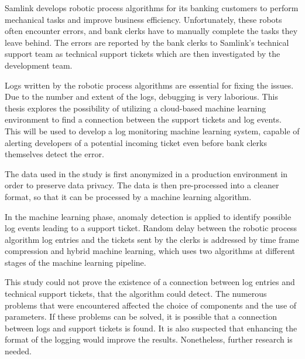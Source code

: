 \documentclass[english, 12pt, a4paper, elec, utf8, a-1b, online]{aaltothesis}
\date{01.08.2022}
\begin{document}
\makecoverpage

\makecopyrightpage


\begin{abstractpage}[english]
      Samlink develops robotic process algorithms for its banking customers
      to perform mechanical tasks and improve business efficiency.
      Unfortunately, these robots often encounter errors,
      and bank clerks have to manually complete
      the tasks they leave behind.
      The errors are reported by the bank clerks to Samlink's technical support team
      as technical support tickets which are then investigated by the development team.

      Logs written by the robotic process algorithms are essential for fixing the issues.
      Due to the number and extent of the logs,
      debugging is very laborious.
      This thesis explores the possibility of
      utilizing a cloud-based machine learning environment
      to find a connection between the support tickets and log events.
      This will be used to develop a log monitoring machine learning system,
      capable of alerting developers of a potential incoming ticket
      even before bank clerks themselves detect the error.

      The data used in the study is first anonymized in a production environment
      in order to preserve data privacy.
      The data is then pre-processed into a cleaner format,
      so that it can be processed by a machine learning algorithm.

      In the machine learning phase, anomaly detection is applied
      to identify possible log events leading to a support ticket.
      Random delay between the robotic process algorithm log entries and the tickets sent by the clerks
      is addressed by time frame compression and hybrid machine learning,
      which uses two algorithms at different stages of the machine learning pipeline.

      This study could not prove the existence of a connection
      between log entries and technical support tickets,
      that the algorithm could detect.
      The numerous problems that were encountered affected the choice of components
      and the use of parameters.
      If these problems can be solved,
      it is possible that a connection between logs and support tickets is found.
      It is also suspected that enhancing the format of the logging would improve the results.
      Nonetheless, further research is needed.
\end{abstractpage}
\end{document}
